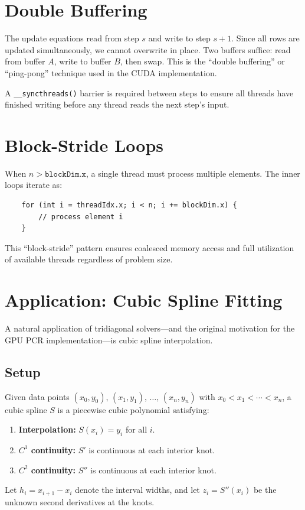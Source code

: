 \documentclass[11pt]{article}
\begin{document}
\section{Double Buffering}

The update equations read from step $s$ and write to step $s+1$.
Since all rows are updated simultaneously, we cannot overwrite in place.
Two buffers suffice: read from buffer $A$, write to buffer $B$, then swap.
This is the ``double buffering'' or ``ping-pong'' technique used in
the CUDA implementation.

A \texttt{\_\_syncthreads()} barrier is required between steps to ensure
all threads have finished writing before any thread reads the next step's
input.

\section{Block-Stride Loops}

When $n > \texttt{blockDim.x}$, a single thread must process multiple
elements. The inner loops iterate as:
\begin{verbatim}
    for (int i = threadIdx.x; i < n; i += blockDim.x) {
        // process element i
    }
\end{verbatim}
This ``block-stride'' pattern ensures coalesced memory access and full
utilization of available threads regardless of problem size.

\section{Application: Cubic Spline Fitting}

A natural application of tridiagonal solvers---and the original motivation
for the GPU PCR implementation---is cubic spline interpolation.

\subsection{Setup}

Given data points $(x_0, y_0),\, (x_1, y_1),\, \ldots,\, (x_n, y_n)$ with
$x_0 < x_1 < \cdots < x_n$, a cubic spline $S$ is a piecewise cubic
polynomial satisfying:
\begin{enumerate}
\item \textbf{Interpolation:} $S(x_i) = y_i$ for all $i$.
\item \textbf{$C^1$ continuity:} $S'$ is continuous at each interior knot.
\item \textbf{$C^2$ continuity:} $S''$ is continuous at each interior knot.
\end{enumerate}
Let $h_i = x_{i+1} - x_i$ denote the interval widths, and let
$z_i = S''(x_i)$ be the unknown second derivatives at the knots.
\end{document}
